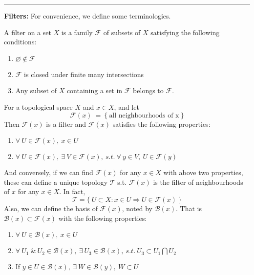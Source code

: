 \documentclass[a4paper,11pt]{report}
\begin{document}
\vspace{0.2in}
\rule{1mm}{1mm} \textbf{Filters:} For convenience, we define some terminologies.
\begin{defn}
	A filter on a set $X$ is a family $\mathscr{F} $ of subsets of $X$ satisfying the following conditions:
	\begin{enumerate}[label=\arabic*)]
		\item $\varnothing \notin \mathscr{F}$
		\item $\mathscr{F}$ is closed under finite many intersections
		\item Any subset of $X$ containing a set in $\mathscr{F}$ belongs to $\mathscr{F}$.
	\end{enumerate}
\end{defn}
\begin{exam}\label{exam1}
	For a topological space $X$ and $x \in X$, and let
	\begin{equation*}
		\mathscr{F}(x) ~=~ \{~\text{all neighbourhoods of x}~\}	
	\end{equation*}
	Then $\mathscr{F}(x)$ is a filter and $\mathscr{F}(x)$ satisfies the following properties:
	\begin{enumerate}[label=\arabic*)]
		\item $\forall~ U \in \mathscr{F}(x),~ x \in U$
		\item $\forall~ U \in \mathscr{F}(x),~ \exists ~ V \in \mathscr{F}(x),~ s.t.~ \forall~ y \in V,~ U \in \mathscr{F}(y)$
	\end{enumerate}
	And conversely, if we can find $\mathscr{F}(x)$ for any $x \in X$ with above two properties, these can define a unique topology $\mathscr{T}$ s.t. $\mathscr{F}(x)$ is the filter of neighbourhoods of $x$ for any $x \in X$. In fact,
	\begin{equation*}
		\mathscr{T} = \{~ U \subset X \colon x \in U \Rightarrow U \in \mathscr{F}(x) ~\}
	\end{equation*}
	Also, we can define the basis of $\mathscr{F}(x)$, noted by $\mathscr{B}(x)$. That is $\mathscr{B}(x) \subset \mathscr{F}(x)$ with the following properties:
	\begin{enumerate}[label=\arabic*)]
		\item $\forall~ U \in \mathscr{B}(x),~ x \in U$
		\item $\forall~ U_1 ~\&~ U_2 \in \mathscr{B}(x),~ \exists ~ U_3 \in \mathscr{B}(x),~ s.t.~ U_3 \subset U_1 \bigcap U_2$
		\item If $y \in U \in \mathscr{B}(x),~ \exists ~ W \in \mathscr{B}(y),~ W \subset U$
	\end{enumerate}
\end{exam}
\end{document}
